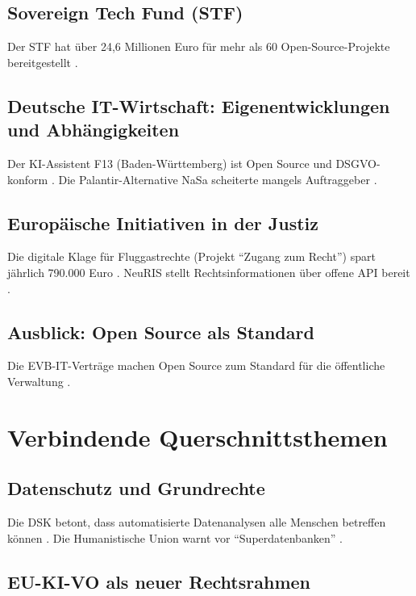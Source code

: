 \documentclass[12pt,a4paper]{article}
\begin{document}
	\subsection{Sovereign Tech Fund (STF)}
	
	Der STF hat über 24,6 Millionen Euro für mehr als 60 Open-Source-Projekte bereitgestellt \cite{SovereignTechFund2025}.
	
	\subsection{Deutsche IT-Wirtschaft: Eigenentwicklungen und Abhängigkeiten}
	
	Der KI-Assistent F13 (Baden-Württemberg) ist Open Source und DSGVO-konform \cite{Staatsanzeiger2025}. Die Palantir-Alternative NaSa scheiterte mangels Auftraggeber \cite{Tagesschau2025b}.
	
	\subsection{Europäische Initiativen in der Justiz}
	
	Die digitale Klage für Fluggastrechte (Projekt \enquote{Zugang zum Recht}) spart jährlich 790.000 Euro \cite{Heise2025c}. NeuRIS stellt Rechtsinformationen über offene API bereit \cite{NeuRIS2025}.
	
	\subsection{Ausblick: Open Source als Standard}
	
	Die EVB-IT-Verträge machen Open Source zum Standard für die öffentliche Verwaltung \cite{ZenDiS2025}.
	
	\section{Verbindende Querschnittsthemen}
	
	\subsection{Datenschutz und Grundrechte}
	
	Die DSK betont, dass automatisierte Datenanalysen alle Menschen betreffen können \cite{DSK2025}. Die Humanistische Union warnt vor \enquote{Superdatenbanken} \cite{HumanUnion2025}.
	
	\subsection{EU-KI-VO als neuer Rechtsrahmen}
	
\end{document}
